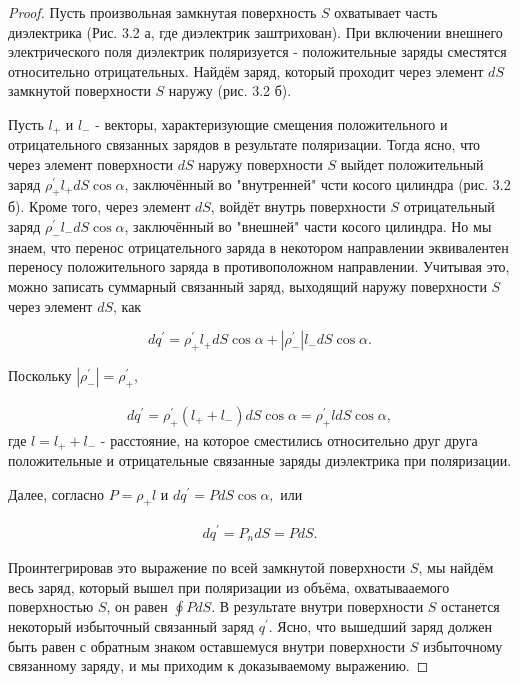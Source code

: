 \documentclass[__main__.tex]{subfiles}
\begin{document}
\begin{proof}
		Пусть произвольная замкнутая поверхность $S$ охватывает часть диэлектрика (Рис. 3.2 а, где диэлектрик заштрихован). При включении внешнего электрического поля диэлектрик поляризуется - положительные заряды сместятся относительно отрицательных. Найдём заряд, который проходит через элемент $dS$ замкнутой поверхности $S$ наружу (рис. 3.2 б).
		
		Пусть $l_+$ и $l_-$ - векторы, характеризующие смещения положительного и отрицательного связанных зарядов в результате поляризации. Тогда ясно, что через элемент поверхности $dS$ наружу поверхности $S$ выйдет положительный заряд $\rho_+^{'} l_+ dS \cos \alpha$, заключённый во "внутренней" чсти косого цилиндра (рис. 3.2 б). Кроме того, через элемент $dS$, войдёт внутрь поверхности $S$ отрицательный заряд $\rho_-^{'} l_- dS \cos \alpha$, заключённый во "внешней" части косого цилиндра. Но мы знаем, что перенос отрицательного заряда в некотором направлении эквивалентен переносу положительного заряда в противоположном направлении. Учитывая это, можно записать суммарный связанный заряд, выходящий наружу поверхности $S$ через элемент $dS$, как
		
		$$dq^{'} = \rho_+^{'} l_+ dS \cos \alpha + |\rho_-^{'}| l_- dS \cos \alpha .$$
		
		Поскольку $|\rho_-^{'}| = \rho_+^{'}$,
		
		\begin{gather}
			dq^{'} = \rho_+^{'} ( l_+ + l_- ) dS \cos \alpha = \rho_+^{'} l dS \cos \alpha ,
		\end{gather}
		где $l = l_+ + l_-$ - расстояние, на которое сместились относительно друг друга положительные и отрицательные связанные заряды диэлектрика при поляризации.
		
		Далее, согласно $P = \rho_+ l$ и $dq^{'} = P dS \cos \alpha,$ или 
		
		\begin{gather}
			dq^{'} = P_n dS = P dS.
		\end{gather}
		
		Проинтегрировав это выражение по всей замкнутой поверхности $S$, мы найдём весь заряд, который вышел при поляризации из объёма, охватывааемого поверхностью $S$, он равен $\oint P dS$. В результате внутри поверхности $S$ останется некоторый избыточный связанный заряд $q^{'}$. Ясно, что вышедший заряд должен быть равен с обратным знаком оставшемуся внутри поверхности $S$ избыточному связанному заряду, и мы приходим к доказываемому выражению.
\end{proof}
\end{document}
